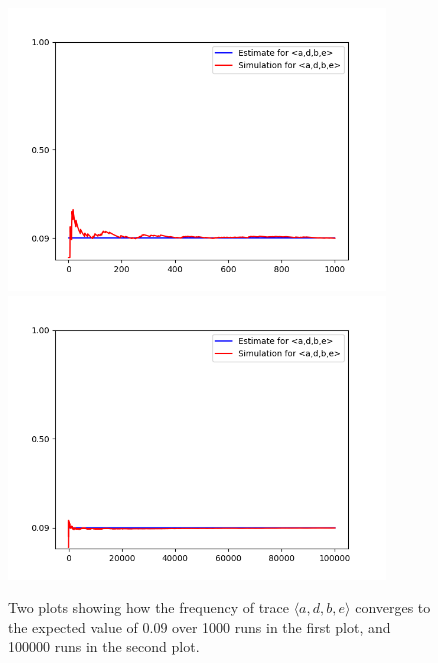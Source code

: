 \begin{figure}%
    \centering
    {{\includegraphics[width=10cm]{figures/adbe1.png} }}%
    \qquad
    {{\includegraphics[width=10cm]{figures/adbe100.png} }}%
    \caption{Two plots showing how the frequency of trace $\langle a,d,b,e \rangle$ converges to the expected value of $0.09$ over 1000 runs in the first plot, and 100000 runs in the second plot.}%
    \label{fig: adbe}%
\end{figure}
%
%
%
%
%
%
